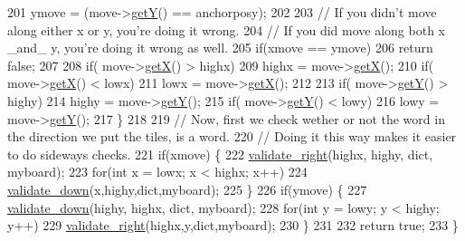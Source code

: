 \begin{DoxyCode}
201         ymove = (move->\hyperlink{class_move_af388d15d91f61a1f909998f50988ac1a}{getY}() == anchorposy);
202 
203         \textcolor{comment}{// If you didn't move along either x or y, you're doing it wrong.}
204         \textcolor{comment}{// If you did move along both x \_and\_ y, you're doing it wrong as well.}
205         \textcolor{keywordflow}{if}(xmove == ymove)
206             \textcolor{keywordflow}{return} \textcolor{keyword}{false};
207 
208         \textcolor{keywordflow}{if}( move->\hyperlink{class_move_a7e3169f48fcca1aa1de4a5cbe67a284d}{getX}() > highx)
209             highx = move->\hyperlink{class_move_a7e3169f48fcca1aa1de4a5cbe67a284d}{getX}();
210         \textcolor{keywordflow}{if}( move->\hyperlink{class_move_a7e3169f48fcca1aa1de4a5cbe67a284d}{getX}() < lowx)
211             lowx = move->\hyperlink{class_move_a7e3169f48fcca1aa1de4a5cbe67a284d}{getX}();
212 
213         \textcolor{keywordflow}{if}( move->\hyperlink{class_move_af388d15d91f61a1f909998f50988ac1a}{getY}() > highy)
214             highy = move->\hyperlink{class_move_af388d15d91f61a1f909998f50988ac1a}{getY}();
215         \textcolor{keywordflow}{if}( move->\hyperlink{class_move_af388d15d91f61a1f909998f50988ac1a}{getY}() < lowy)
216             lowy = move->\hyperlink{class_move_af388d15d91f61a1f909998f50988ac1a}{getY}();
217     \}
218 
219     \textcolor{comment}{// Now, first we check wether or not the word in the direction we put the tiles, is a word.}
220     \textcolor{comment}{// Doing it this way makes it easier to do sideways checks.}
221     \textcolor{keywordflow}{if}(xmove) \{
222         \hyperlink{class_play_a6699a989cb202ffc8db61093fea15d1f}{validate\_right}(highx, highy, dict, myboard);
223         \textcolor{keywordflow}{for}(\textcolor{keywordtype}{int} x = lowx; x < highx; x++)
224             \hyperlink{class_play_ae7096a77ed85b5251f2faccfb092616b}{validate\_down}(x,highy,dict,myboard);
225     \}
226     \textcolor{keywordflow}{if}(ymove) \{
227         \hyperlink{class_play_ae7096a77ed85b5251f2faccfb092616b}{validate\_down}(highy, highx, dict, myboard);
228         \textcolor{keywordflow}{for}(\textcolor{keywordtype}{int} y = lowy; y < highy; y++)
229             \hyperlink{class_play_a6699a989cb202ffc8db61093fea15d1f}{validate\_right}(highx,y,dict,myboard);
230     \}
231 
232     \textcolor{keywordflow}{return} \textcolor{keyword}{true};
233 \}
\end{DoxyCode}
